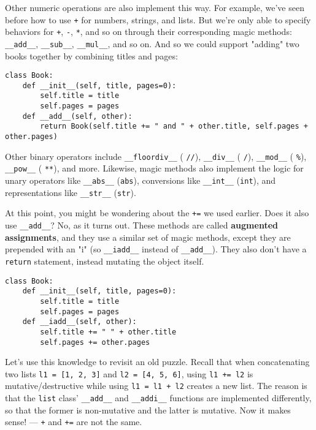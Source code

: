 Other numeric operations are also implement this way. For example, we've seen before how to use \lstinline{+} for numbers, strings, and lists. But we're only able to specify behaviors for \lstinline{+}, \lstinline{-}, \lstinline{*}, and so on through their corresponding magic methods: \lstinline{__add__}, \lstinline{__sub__}, \lstinline{__mul__}, and so on. And so we could support "adding" two books together by combining titles and pages:

\begin{lstlisting}
class Book:
	def __init__(self, title, pages=0):
		self.title = title
		self.pages = pages
	def __add__(self, other):
		return Book(self.title += " and " + other.title, self.pages + other.pages)
\end{lstlisting}

Other binary operators include \lstinline{__floordiv__} ( \lstinline{//}),  \lstinline{__div__} ( \lstinline{/}),  \lstinline{__mod__} ( \lstinline{%}),  \lstinline{__pow__} ( \lstinline{**}), and more. Likewise, magic methods also implement the logic for unary operators like \lstinline{__abs__} (\lstinline{abs}), conversions like \lstinline{__int__} (\lstinline{int}), and representations like \lstinline{__str__} (\lstinline{str}).

At this point, you might be wondering about the \lstinline{+=} we used earlier. Does it also use \lstinline{__add__}? No, as it turns out. These methods are called \textbf{augmented assignments}, and they use a similar set of magic methods, except they are prepended with an "i" (so \lstinline{__iadd__} instead of \lstinline{__add__}). They also don't have a \lstinline{return} statement, instead mutating the object itself.

\begin{lstlisting}
class Book:
	def __init__(self, title, pages=0):
		self.title = title
		self.pages = pages
	def __iadd__(self, other):
		self.title += " " + other.title
		self.pages += other.pages
\end{lstlisting}

Let's use this knowledge to revisit an old puzzle. Recall that when concatenating two lists \lstinline{l1 = [1, 2, 3]} and \lstinline{l2 = [4, 5, 6]}, using \lstinline{l1 += l2} is mutative/destructive while using \lstinline{l1 = l1 + l2} creates a new list. The reason is that the \lstinline{list} class' \lstinline{__add__} and \lstinline{__addi__} functions are implemented differently, so that the former is non-mutative and the latter is mutative. Now it makes sense! — \lstinline{+} and \lstinline{+=} are not the same.

